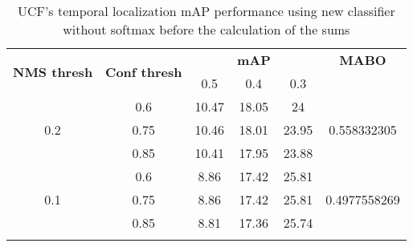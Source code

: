\begin{center}

  \setlength{\tabcolsep}{2pt}
  \begin{longtable}{|| c | c || c c c | c ||}

    \hline
    \multirow{2}{*}{\textbf{NMS thresh}} & \multirow{2}{*}{\textbf{Conf thresh}} & {} & \textbf{mAP} & {} & \textbf{MABO} \\
    {} & {} & 0.5 & 0.4 & 0.3 & {}\\
    \hline
    \multirow{3}{*}{0.2} & 0.6 & 10.47  & 18.05 & 24 & \multirow{3}{*}{0.558332305}\\
    \cline{2-5}
    {} & 0.75 & 10.46 & 18.01 & 23.95 & {} \\
    \cline{2-5}
    {} & 0.85 & 10.41 & 17.95 & 23.88 & {} \\
    \hline
    \multirow{3}{*}{0.1} & 0.6 & 8.86 & 17.42 & 25.81  & \multirow{3}{*}{0.4977558269} \\
    \cline{2-5}
    {} & 0.75 & 8.86 & 17.42 & 25.81 & {} \\
    \cline{2-5}
    {} & 0.85 & 8.81 & 17.36 & 25.74 & {} \\
    \hline

    \caption{UCF's temporal localization mAP performance using new classifier without softmax before the calculation of the sums}
    \label{table:temp_cls_5}
  \end{longtable}
\end{center}


